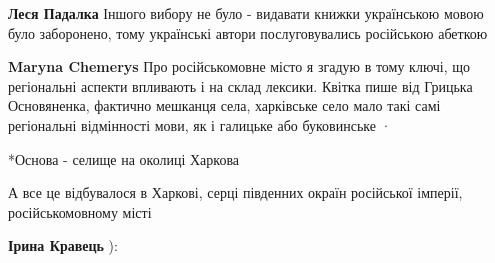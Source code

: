 \begin{itemize}
\begin{itemize}
 

\textbf{Леся Падалка} Іншого вибору не було - видавати книжки українською мовою
було заборонено, тому українські автори послуговувались російською абеткою

\begin{itemize}
 
\textbf{Maryna Chemerys} Про російськомовне місто я згадую в тому ключі, що
регіональні аспекти впливають і на склад лексики. Квітка пише від Грицька
Основяненка, фактично мешканця села, харківське село мало такі самі регіональні
відмінності мови, як і галицьке або буковинське · 


 
*Основа - селище на околиці Харкова
\end{itemize}

 
А все це відбувалося в Харкові, серці південних окраїн російської імперії, російськомовному місті

\end{itemize}

 
\textbf{Ірина Кравець} ):


 

\end{itemize}
